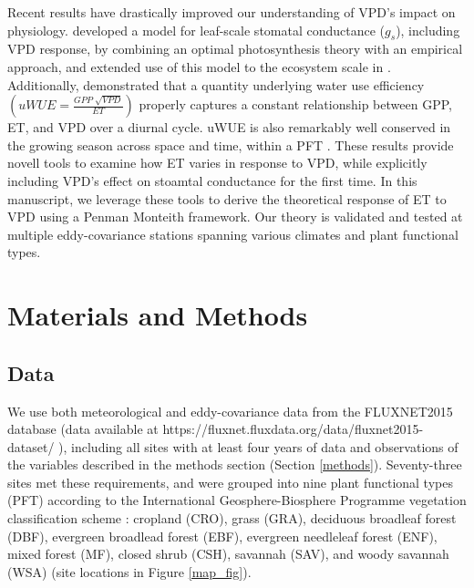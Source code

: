 \documentclass[draft,linenumbers]{agujournal}
\begin{document}
Recent results have drastically improved our understanding of VPD's
impact on physiology. \citet{MEDLYN_2011} developed a model for
leaf-scale stomatal conductance ($g_s$), including VPD response, by
combining an optimal photosynthesis theory \citep{Farquhar_1980,
  Katul_2010} with an empirical approach, and extended use of this
model to the ecosystem scale in \citet{Medlyn_2017}. Additionally,
\citet{Zhou_2014} demonstrated that a quantity underlying water use
efficiency $\left(uWUE = \frac{GPP\; \sqrt{VPD}}{ET}\right)$ properly
captures a constant relationship between GPP, ET, and VPD over a
diurnal cycle. uWUE is also remarkably well conserved in the growing
season across space and time, within a PFT \citep{Zhou_2015}. These
results provide novell tools to examine how ET varies in response to
VPD, while explicitly including VPD's effect on stoamtal conductance
for the first time. In this manuscript, we leverage these tools to
derive the theoretical response of ET to VPD using a Penman Monteith
framework. Our theory is validated and tested at multiple
eddy-covariance stations spanning various climates and plant
functional types.

\section{Materials and Methods}
\subsection{Data}
\label{data}
We use both meteorological and eddy-covariance data from the
FLUXNET2015 database (data available at \sloppy
https://fluxnet.fluxdata.org/data/fluxnet2015-dataset/ \sloppy),
including all sites with at least four years of data and observations
of the variables described in the methods section (Section
\ref{methods}). Seventy-three sites met these requirements, and were
grouped into nine plant functional types (PFT) according to the
International Geosphere-Biosphere Programme vegetation classification
scheme \citep{Loveland_1999}: cropland (CRO), grass (GRA), deciduous
broadleaf forest (DBF), evergreen broadlead forest (EBF), evergreen
needleleaf forest (ENF), mixed forest (MF), closed shrub (CSH),
savannah (SAV), and woody savannah (WSA) (site locations in Figure
\ref{map_fig}).
\end{document}
